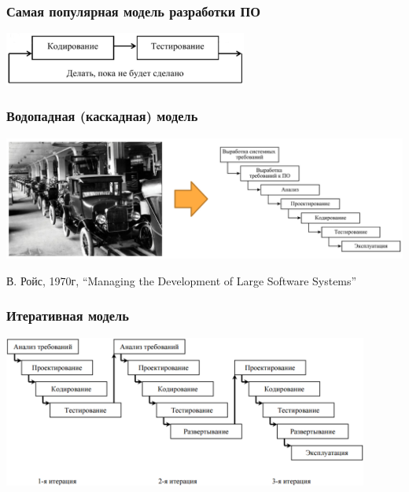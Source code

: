 \documentclass{../../slides-style}
\begin{document}
    \begin{frame}
        \frametitle{Самая популярная модель разработки ПО}
        \begin{center}
            \includegraphics[width=0.6\textwidth]{cowboyCodingModel.png}
        \end{center}
    \end{frame}

    \begin{frame}
        \frametitle{Водопадная (каскадная) модель}
        \begin{center}
            \includegraphics[width=\textwidth]{waterfallAndConveyor.png}
        \end{center}
        В. Ройс, 1970г, \enquote{Managing the Development of Large Software Systems}
    \end{frame}

    \begin{frame}
        \frametitle{Итеративная модель}
        \begin{center}
            \includegraphics[width=0.9\textwidth]{iterativeModel.png}
        \end{center}
    \end{frame}
\end{document}
